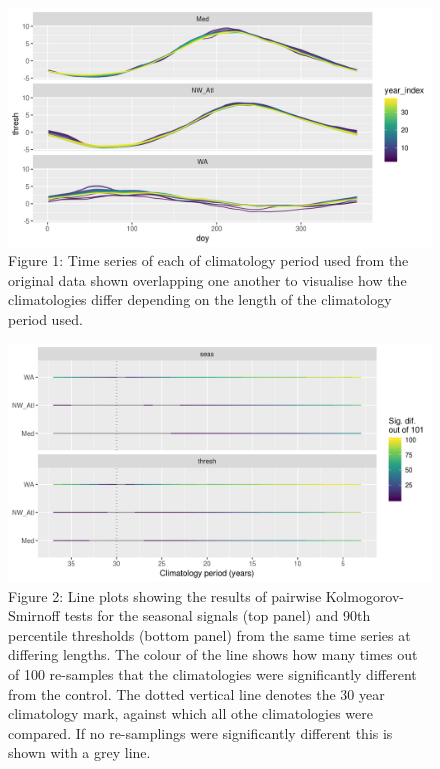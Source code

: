 \documentclass[]{article}
\begin{document}
\begin{figure}
\centering
\includegraphics{../docs/articles/time_series_duration_files/figure-html/clim-ts-all-1.png}
\caption{Figure 1: Time series of each of climatology period used from
the original data shown overlapping one another to visualise how the
climatologies differ depending on the length of the climatology period
used.}
\end{figure}

\begin{figure}
\centering
\includegraphics{../docs/articles/time_series_duration_files/figure-html/KS-clims-1.png}
\caption{Figure 2: Line plots showing the results of pairwise
Kolmogorov-Smirnoff tests for the seasonal signals (top panel) and 90th
percentile thresholds (bottom panel) from the same time series at
differing lengths. The colour of the line shows how many times out of
100 re-samples that the climatologies were significantly different from
the control. The dotted vertical line denotes the 30 year climatology
mark, against which all othe climatologies were compared. If no
re-samplings were significantly different this is shown with a grey
line.}
\end{figure}
\end{document}
